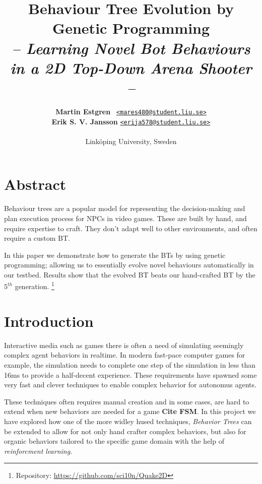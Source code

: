 \documentclass[a4paper, twocolumn]{article}
\title{\textbf{Behaviour Tree Evolution by Genetic Programming}\\
       \Large{\emph{-- Learning Novel Bot Behaviours in a 2D Top-Down Arena Shooter --}}}
\author{{\textbf{Martin Estgren}} \;\;\;\;\;\;\;\;\;\, {\href{mailto:mares480@student.liu.se}
                                                       {\texttt{<mares480@student.liu.se>}}} \\
        {\textbf{Erik S. V. Jansson}} \;\;\;\;         {\href{mailto:erija578@student.liu.se}
                                                       {\texttt{<erija578@student.liu.se>}}} \\~\\
        {Linköping University, Sweden}\vspace{-2.0ex}}
\begin{document}
    \maketitle
    \section*{Abstract}

    Behaviour trees are a popular model for representing the decision-making and plan execution process for NPCs in video games. These are built by hand, and require expertise to craft. They don't adapt well to other environments, and often require a custom BT.

    In this paper we demonstrate how to generate the BTs by using genetic programming; allowing us to essentially evolve novel behaviours automatically in our testbed. Results show that the evolved BT beats our hand-crafted BT by the \(5^{th}\) generation. \footnote{Repository: \url{https://github.com/sci10n/Quake2D}}

    \vspace{1.8em}

    \begingroup
    \def\addvspace#1{}
    \tableofcontents
    \endgroup
    \newpage

    \newpage %
    \nocite{*} %
    
    
    \clearpage

    \section{Introduction} \label{sec:introduction}
	
	Interactive media such as games there is often a need of simulating seemingly complex agent behaviors in realtime. In modern fast-pace computer games for example, the simulation needs to complete one step of the simulation in less than 16ms to provide a half-decent experience. These requirements have spawned some very fast and clever techniques to enable complex behavior for autonomus agents.

	These techniques often requires manual creation and in some cases, are hard to extend when new behaviors are needed for a game \textbf{Cite FSM}. In this project we have explored how one of the more widley hused techniques, \emph{Behavior Trees} can be extended to allow for not only hand crafter complex behaviors, but also for organic behaviors tailored to the specific game domain with the help of \emph{reinforcment learning}.
\end{document}
